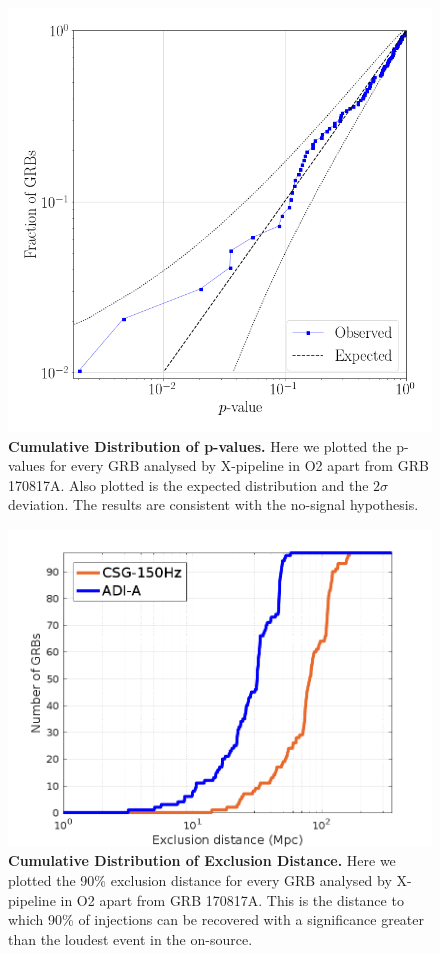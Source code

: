 \documentclass[11pt]{cuthesis}
\newcommand{\xp}{X-pipeline }
\begin{document}
\begin{figure} %
\begin{center}
\includegraphics[width=0.8\linewidth]{xpvalue.png}
\end{center}
\caption{\textbf{Cumulative Distribution of p-values.} Here we plotted the p-values for every GRB analysed by \xp in O2 apart from GRB 170817A. Also plotted is the expected distribution and the $2\sigma$ deviation. The results are consistent with the no-signal hypothesis. \cite{o2grb}} 
\label{fig:xpvalue}
\end{figure}

\begin{figure} %
\begin{center}
\includegraphics[width=0.8\linewidth]{burst_exclusion_distance.png}
\end{center}
\caption{\textbf{Cumulative Distribution of Exclusion Distance.} Here we plotted the 90\% exclusion distance for every GRB analysed by \xp in O2 apart from GRB 170817A. This is the distance to which 90\% of injections can be recovered with a significance greater than the loudest event in the on-source.\cite{o2grb} } 
\label{fig:x ex dist}
\end{figure}
\end{document}
